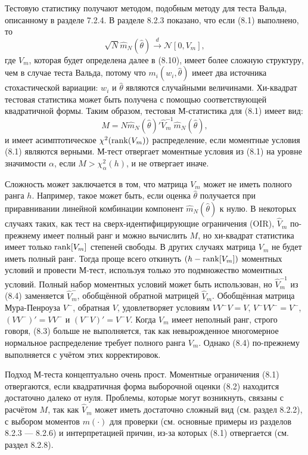 Тестовую статистику получают методом, подобным методу для теста Вальда, описанному в разделе 7.2.4. В разделе 8.2.3 показано, что если (8.1) выполнено, то
\begin{equation}
\sqrt{N}\hat{m}_N (\hat{\theta}) \stackrel{d}{\rightarrow} \mathcal{N}[0,V_m],
\end{equation} 
где $V_m$, которая будет определена далее в (8.10), имеет более сложную структуру, чем в случае теста Вальда, потому что $m_i(w_i, \hat{\theta})$ имеет два источника стохастической вариации: $w_i$ и $\hat{\theta}$ являются случайными величинами. Хи-квадрат тестовая статистика может быть получена с помощью соответствующей квадратичной формы. Таким образом, тестовая М-статистика для (8.1) имеет вид:
\begin{equation}
M = N\hat{m}_N (\hat{\theta})'\hat{V}_m^{-1}\hat{m}_N (\hat{\theta}),
\end{equation}
и имеет асимптотическое $\chi^2(\mathrm{rank}(V_m))$ распределение, если моментные условия (8.1) являются верными. М-тест отвергает моментные условия из (8.1) на уровне значимости $\alpha$, если $M > \chi_{\alpha}^2(h)$, и не отвергает иначе.

Сложность может заключается в том, что матрица $V_m$ может не иметь полного ранга $h$. Например, такое может быть, если оценка $\hat{\theta}$ получается при приравнивании линейной комбинации компонент $\hat{m}_N (\hat{\theta})$ к нулю. В некоторых случаях таких, как тест на сверх-идентифицирующие ограничения (OIR), $\hat{V}_m$ по-прежнему имеет полный ранг и можно вычислить $M$, но хи-квадрат статистика имеет только $\mathrm{rank}[V_m]$ степеней свободы. В других случаях матрица $V_m$ не будет иметь полный ранг. Тогда проще всего откинуть $(h - \mathrm{rank}[V_m])$ моментных условий и провести М-тест, используя только это подмножество моментных условий. Полный набор моментных условий может быть использован, но $\hat{V}_m^{-1}$ из (8.4) заменяется $\hat{V}_m^{-}$, обобщённой обратной матрицей $\hat{V}_m$. Обобщённая матрица Мура-Пенроуза $V^{-}$, обратная $V$,  удовлетворяет условиям $VV^{-}V = V$, $V^{-}VV^{-} = V^{-}$, $(VV^{-})' = VV^{-}$ и $(V^{-}V)' = V^{-}V$. Когда $V_m$ имеет неполный ранг, строго говоря, (8.3) больше не выполняется, так как невырожденное многомерное нормальное распределение требует полного ранга $V_m$. Однако (8.4) по-прежнему выполняется с учётом этих корректировок.
 
Подход М-теста концептуально очень прост. Моментные ограничения (8.1) отвергаются, если квадратичная форма выборочной оценки (8.2) находится достаточно далеко от нуля. Проблемы, которые могут возникнуть, связаны с расчётом $M$, так как $\hat{V}_m$ может иметь достаточно сложный вид (см. раздел 8.2.2), с выбором моментов $m(\cdot)$ для проверки (см. основные примеры из разделов 8.2.3 --- 8.2.6) и интерпретацией причин, из-за которых (8.1) отвергается (см. раздел 8.2.8).

